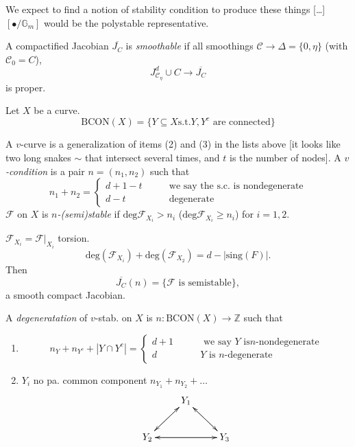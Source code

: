 \medskip\noindent
We expect to find a notion of stability
condition to produce these things
[…] $[\bullet/ \mathbb{G}_m]$ would be the
polystable representative.

\begin{definition}
\label{definition-smoot-compa-jacob}
A compactified Jacobian $\overline{J_C}$ is
{\it smoothable} if all smoothings
$\mathcal{C}\to \Delta=\{0,\eta\}$ (with
$\mathcal{C}_0=C$),
$$
J^d_{\mathcal{C}_\eta}\cup C \to
\overline{J_C}
$$
is proper.
\end{definition}

\medskip\noindent

\begin{definition}
\label{definition-connected}
Let $X$ be a curve.
$$
\text{BCON}(X)=\{Y \subseteq X\text{s.t.
}Y,Y^c \text{ are connected}\}
$$
\end{definition}

\begin{definition}
\label{definition-v-satbility}
A $v$-curve is a generalization of items (2)
and (3) in the lists above
[it looks like two long snakes $\sim$ that
intersect several times, and $t$ is
the number of nodes].
A {\it $v$-condition} is a pair $n=(n_1,n_2)$
such that
$$
n_1+n_2=\begin{cases}
d+1-t\qquad &\text{we say the s.c. is
nondegenerate} \\
d-t\qquad &\text{degenerate}
\end{cases}
$$
$\mathcal{F}$ on $X$ is  {\it
$n$-(semi)stable} if
$\text{deg}\mathcal{F}_{X_i}>n_i$
($\text{deg}\mathcal{F}_{X_i}\geq n_i$)
for $i=1,2$.
\end{definition}
$\mathcal{F}_{X_i}=\mathcal{F}|_{X_i}$
torsion.
$$
\text{deg}(\mathcal{F}_{X_i})+\text{deg}
(\mathcal{F}_{X_2})
=d-|\text{sing}(F)|.
$$
Then
$$
\overline{J_C}(n)=\{\mathcal{F}\text{ is
semistable}\},
$$
a smooth compact Jacobian.

\begin{definition}
\label{definition-n-degeneracy}
A {\it degeneratation} of $v$-stab. on $X$ is
$n:\text{BCON}(X) \to \mathbb{Z}$
such that
\begin{enumerate}
\item
$$
n_Y+n_{Y^c}+|Y \cap Y^c|=
\begin{cases}
d+1\qquad &\text{ we say $Y$ is
$n$-nondegenerate} \\
d\qquad &\text{$Y$ is $n$-degenerate}
\end{cases}
$$
\item $Y_i$ no pa. common component
$n_{Y_1}+n_{Y_2}+\ldots$
$$
\xymatrix{
&Y_1\ar[dr]\ar[dl]\\
Y_2\ar[ur]\ar[rr]&&Y_3\ar[ll]\ar[ul]
}
$$
\end{enumerate}
\end{definition}


